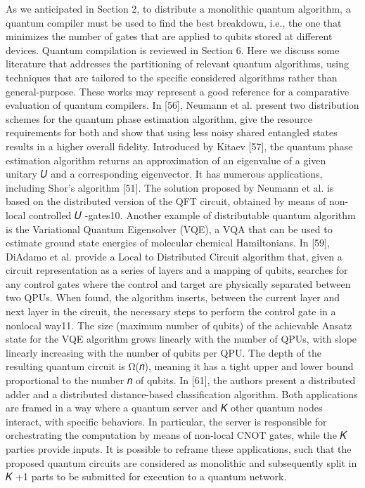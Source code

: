 As we anticipated in Section 2, to distribute a monolithic quantum algorithm, a quantum compiler must be used to find the best breakdown, i.e., the one that minimizes the number of gates that are applied to qubits stored at different devices. Quantum compilation is reviewed in Section 6. Here we discuss some literature that addresses the partitioning of relevant quantum algorithms, using techniques that are tailored to the specific considered algorithms rather than general-purpose. These works may represent a good reference for a comparative evaluation of quantum compilers. In [56], Neumann et al. present two distribution schemes for the quantum phase estimation algorithm, give the resource requirements for both and show that using less noisy shared entangled states results in a higher overall fidelity. Introduced by Kitaev [57], the quantum phase estimation algorithm returns an approximation of an eigenvalue of a given unitary 𝑈 and a corresponding eigenvector. It has numerous applications, including Shor’s algorithm [51]. The solution proposed by Neumann et al. is based on the distributed version of the QFT circuit, obtained by means of non-local controlled 𝑈 -gates10. Another example of distributable quantum algorithm is the Variational Quantum Eigensolver (VQE), a VQA that can be used to estimate ground state energies of molecular chemical Hamiltonians. In [59], DiAdamo et al. provide a Local to Distributed Circuit algorithm that, given a circuit representation as a series of layers and a mapping of qubits, searches for any control gates where the control and target are physically separated between two QPUs. When found, the algorithm inserts, between the current layer and next layer in the circuit, the necessary steps to perform the control gate in a nonlocal way11. The size (maximum number of qubits) of the achievable Ansatz state for the VQE algorithm grows linearly with the number of QPUs, with slope linearly increasing with the number of qubits per QPU. The depth of the resulting quantum circuit is Ω(𝑛), meaning it has a tight upper and lower bound proportional to the number 𝑛 of qubits. In [61], the authors present a distributed adder and a distributed distance-based classification algorithm. Both applications are framed in a way where a quantum server and 𝐾 other quantum nodes interact, with specific behaviors. In particular, the server is responsible for orchestrating the computation by means of non-local CNOT gates, while the 𝐾 parties provide inputs. It is possible to reframe these applications, such that the proposed quantum circuits are considered as monolithic and subsequently split in 𝐾 +1 parts to be submitted for execution to a quantum network.

